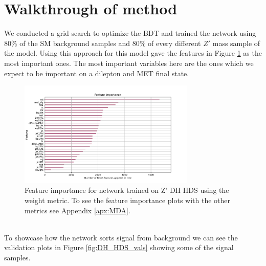 \documentclass[12pt, a4paper]{book}
\begin{document}
\section{Walkthrough of method}\label{sec:Walkthrough}
We conducted a grid search to optimize the BDT and trained the network using 80\% of the SM background samples and 80\% of every different $Z'$ mass sample of the model. Using this approach for this model gave the features in Figure \ref{fig:DH_HDS_feat} as the most important ones. The most important variables here are the ones which we expect 
to be important on a dilepton and MET final state.\\
\begin{figure}[!ht]
	\centering
      \includegraphics[width=0.75\textwidth]{XGBoost/DH_HDS/feature_importance/weight.pdf}
   \caption{Feature importance for network trained on Z' DH HDS using the weight metric. To see the feature importance plots with the other metrics see Appendix \ref{apx:MDA}.}\label{fig:DH_HDS_feat}
\end{figure}
\\To showcase how the network sorts signal from background we can see the validation plots in Figure \ref{fig:DH_HDS_vals} showing some of the signal samples.\\
\end{document}
